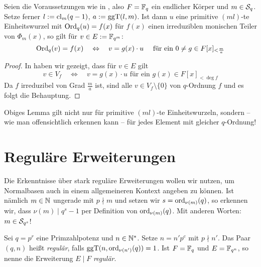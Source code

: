 \begin{lemma}
  \label{lemma:erzeuger_von_irred_teilmoduln}
  Seien die Voraussetzungen wie in , also
  $F = \F_q$ ein endlicher Körper und $m\in \S_q$. Setze ferner 
  $l := \cl_m(q-1)$, $a := \ggT(l,m)$. Ist dann $u$ eine primitive 
  $(ml)$-te Einheitswurzel mit $\Ord_q(u) = f(x)$ für $f(x)$ einen irreduziblen
  monischen Teiler von $\Phi_m(x)$, so gilt für $v \in E:= \F_{q^m}$:
  \[ \Ord_q(v) = f(x) \quad\Leftrightarrow\quad
    v = g(x) \cdot u\quad\text{ für ein } 0\neq g\in F[x]_{<\frac m a}\]
\end{lemma}
\begin{proof}
  In  haben wir gezeigt, dass für $v \in E$ gilt
  \[ v \in V_f \quad\Leftrightarrow\quad v = g(x)\cdot u 
    \text{ für ein } g(x) \in F[x]_{<\deg f}\]
  Da $f$ irreduzibel von Grad $\frac m a$ ist, sind alle $v \in
  V_f\setminus\{0\}$ von $q$-Ordnung $f$ und es folgt die Behauptung.
\end{proof}

\begin{bemerkung}
  Obiges Lemma gilt nicht nur für primitive $(ml)$-te Einheitswurzeln, sondern
  -- wie man offensichtlich erkennen kann -- für jedes Element mit gleicher
  $q$-Ordnung!
\end{bemerkung}




\section{Reguläre Erweiterungen}

Die Erkenntnisse über stark reguläre Erweiterungen wollen wir nutzen, um
Normalbasen auch in einem allgemeineren Kontext angeben zu können. Ist nämlich
$m\in\N$ ungerade mit $p\nmid m$ und setzen wir $s = \ord_{\nu(m)}(q)$, 
so erkennen wir, dass $\nu(m) \mid q^s-1$ per Definition von
$\ord_{\nu(m)}(q)$. Mit anderen Worten: $m \in \S_{q^s}$! 

\begin{definition}[regulär]
  Sei $q = p^r$ eine Primzahlpotenz und $n\in \N^\ast$. Setze 
  $n = n' p^c$ mit $p\nmid n'$. Das Paar $(q,n)$ heißt \emph{regulär}, falls
  $\ggT(n, \ord_{\nu(n')}(q)) = 1$. 
  Ist $F = \F_q$ und $E = \F_{q^n}$, so nenne die Erweiterung $E\mid F$ 
  \emph{regulär}.
\end{definition}

